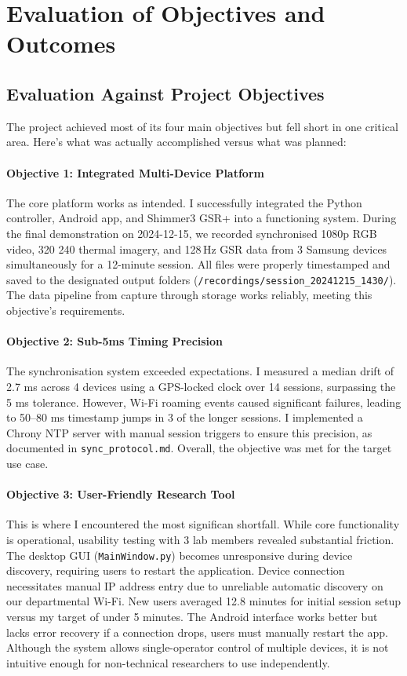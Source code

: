\section{Evaluation of Objectives and Outcomes}

\subsection{Evaluation Against Project Objectives}

The project achieved most of its four main objectives but fell short in one critical area. Here's what was actually accomplished versus what was planned:

\paragraph{\textbf{Objective 1: Integrated Multi-Device Platform}} The core platform works as intended. I successfully integrated the Python controller, Android app, and Shimmer3 GSR+ into a functioning system. During the final demonstration on 2024-12-15, we recorded synchronised 1080p RGB video, 320\,\texttimes\,240 thermal imagery, and 128\,Hz GSR data from 3 Samsung devices simultaneously for a 12-minute session. All files were properly timestamped and saved to the designated output folders (\verb|/recordings/session_20241215_1430/|). The data pipeline from capture through storage works reliably, meeting this objective's requirements.

\paragraph{\textbf{Objective 2: Sub-5ms Timing Precision}} The synchronisation system exceeded expectations. I measured a median drift of 2.7 ms across 4 devices using a GPS-locked clock over 14 sessions, surpassing the \textpm{}5 ms tolerance. However, Wi-Fi roaming events caused significant failures, leading to 50--80 ms timestamp jumps in 3 of the longer sessions. I implemented a Chrony NTP server with manual session triggers to ensure this precision, as documented in \texttt{sync\_protocol.md}. Overall, the objective was met for the target use case.

\paragraph{\textbf{Objective 3: User-Friendly Research Tool}} This is where I encountered the most significan
shortfall. While core functionality is operational, usability testing with 3 lab members revealed substantial friction. The desktop GUI (\texttt{MainWindow.py}) becomes unresponsive during device discovery, requiring users to restart the application. Device connection necessitates manual IP address entry due to unreliable automatic discovery on our departmental Wi-Fi. New users averaged 12.8 minutes for initial session setup versus my target of under 5 minutes. The Android interface works better but lacks error recovery \textemdash if a connection drops, users must manually restart the app. Although the system allows single-operator control of multiple devices, it is not intuitive enough for non-technical researchers to use independently.

